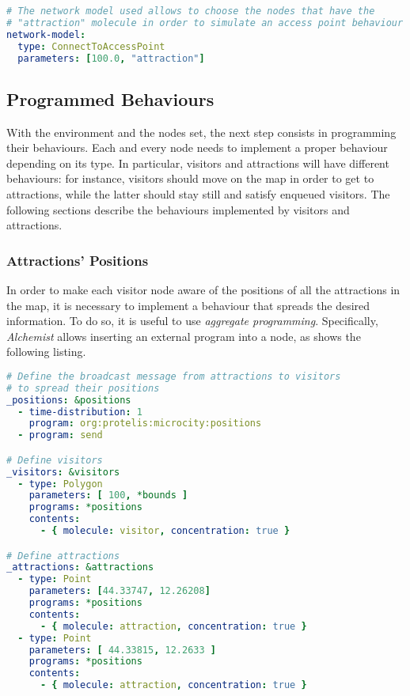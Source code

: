 \begin{lstlisting}[language=yaml, label=code:linking, caption=Defining the linking rule: only nodes with the molecule \texttt{attraction} will connect to other nodes within a radius of 100 meters.]
# The network model used allows to choose the nodes that have the
# "attraction" molecule in order to simulate an access point behaviour
network-model:
  type: ConnectToAccessPoint
  parameters: [100.0, "attraction"]
\end{lstlisting}

\subsection{Programmed Behaviours}
With the environment and the nodes set, the next step consists in programming their behaviours.
Each and every node needs to implement a proper behaviour depending on its type.
In particular, visitors and attractions will have different behaviours: for instance, visitors should move on the map in order to get to attractions, while the latter should stay still and satisfy enqueued visitors.
The following sections describe the behaviours implemented by visitors and attractions.

\subsubsection{Attractions' Positions}
In order to make each visitor node aware of the positions of all the attractions in the map, it is necessary to implement a behaviour that spreads the desired information. To do so, it is useful to use \textit{aggregate programming}.
Specifically, \textit{Alchemist} allows inserting an external program into a node, as shows the following listing.

\begin{lstlisting}[language=yaml, label=code:positions, caption=Assign the \texttt{org:protelis:microcity:positions} behaviour to 100 visitors and 2 attractions.]
# Define the broadcast message from attractions to visitors
# to spread their positions
_positions: &positions
  - time-distribution: 1
    program: org:protelis:microcity:positions
  - program: send

# Define visitors
_visitors: &visitors
  - type: Polygon
    parameters: [ 100, *bounds ]
    programs: *positions
    contents:
      - { molecule: visitor, concentration: true }

# Define attractions
_attractions: &attractions
  - type: Point
    parameters: [44.33747, 12.26208]
    programs: *positions
    contents:
      - { molecule: attraction, concentration: true }
  - type: Point
    parameters: [ 44.33815, 12.2633 ]
    programs: *positions
    contents:
      - { molecule: attraction, concentration: true }
\end{lstlisting}

